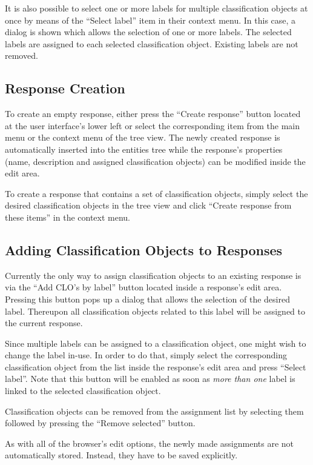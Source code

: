 It is also possible to select one or more labels for multiple classification
objects at once by means of the ``Select label'' item in their context menu. In
this case, a dialog is shown which allows the selection of one or more
labels. The selected labels are assigned to each selected classification
object. Existing labels are not removed.


\subsection{Response Creation}

To create an empty response, either press the ``Create response'' button located
at the user interface's lower left or select the corresponding item from the
main menu or the context menu of the tree view.  The newly created response is
automatically inserted into the entities tree while the response's properties
(name, description and assigned classification objects) can be modified inside
the edit area.

To create a response that contains a set of classification objects, simply
select the desired classification objects in the tree view and click ``Create
response from these items'' in the context menu.


\subsection{Adding Classification Objects to Responses}

Currently the only way to assign classification objects to an existing response
is via the ``Add CLO's by label'' button located inside a response's edit area.
Pressing this button pops up a dialog that allows the selection of the desired
label. Thereupon all classification objects related to this label will be
assigned to the current response.

Since multiple labels can be assigned to a classification object, one might wish
to change the label in-use. In order to do that, simply select the corresponding
classification object from the list inside the response's edit area and press
``Select label''. Note that this button will be enabled as soon as \emph{more
  than one} label is linked to the selected classification object.

Classification objects can be removed from the assignment list by selecting them
followed by pressing the ``Remove selected'' button.

As with all of the browser's edit options, the newly made assignments are not
automatically stored. Instead, they have to be saved explicitly.

